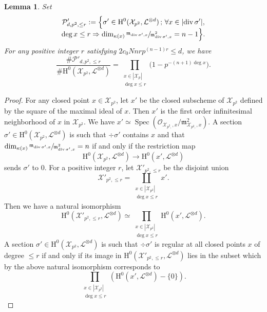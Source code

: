 \documentclass[11pt]{article}
\numberwithin{equation}{section}
\newcommand{\sep}{\,;\,}
\theoremstyle{plain}
\newtheorem{lem}[thm]{Lemma}
\theoremstyle{definition}
\newcommand{\ho}{\mathrm{H}}
\newcommand{\Oc}{\mathcal{O}}
\newcommand{\m}{\mathfrak{m}}
\newcommand{\X}{\mathcal{X}}
\newcommand{\li}{\mathcal{L}}
\DeclareMathOperator{\Spec}{Spec}
\begin{document}
\begin{lem}\label{smalldegree}
Set
\begin{multline*}
\mathcal{P}'_{d,p^2,\leq r}:=\Bigl\{ \sigma'\in \ho^0(\X_{p^2}, \li^{\otimes d})\sep \forall x\in |{\div\sigma'}|,\\[-5pt] \deg x\leq r\Rightarrow \dim_{\kappa(x)}\sfrac{\m_{\div \sigma',x}}{\m^2_{\div \sigma', x}}=n-1 \Bigr\}.
\end{multline*}
For any positive integer $r$ satisfying $2c_0Nnrp^{(n-1)r}\leq d$, we have
\[
\frac{\#\mathcal{P}'_{d,p^2,\leq r}}{\#\ho^0(\X_{p^2}, \li^{\otimes d})}=\prod_{\substack{x\in |\X_{p}|\\ \deg x\leq r}} \bigl(1-p^{-(n+1)\deg x} \bigr).
\]
\end{lem}
\begin{proof}
For any closed point $x\in \X_{p^2}$, let $x'$ be the closed subscheme of $\X_{p^2}$ defined by the square of the maximal ideal of $x$. Then $x'$ is the first order infinitesimal neighborhood of $x$ in $\X_{p^2}$. We have $x'\simeq \Spec (\Oc_{\X_{p^2,},x}/\mathfrak{m}_{\X_{p^2,},x}^2)$. A section $\sigma'\in \ho^0(\X_{p^2}, \li^{\otimes d})$ is such that $\div \sigma'$ contains $x$ and that $ \dim_{\kappa(x)}\sfrac{\m_{\div \sigma',x}}{\m^2_{\div \sigma', x}}=n$ if and only if the restriction map\vspace*{-3pt}
\[
\ho^0(\X_{p^2}, \li^{\otimes d}) \to \ho^0(x', \li^{\otimes d})
\]
sends $\sigma'$ to $0$. For a positive integer $r$, let $\X'_{p^2,\leq r}$ be the disjoint union\vspace*{-3pt}
\[
\X'_{p^2,\leq r}=\coprod_{\substack{x\in |\X_{p^2}|\\ \deg x\leq r}}x'.\]
Then we have a natural isomorphism\vspace*{-3pt}
\[
\ho^0(\X'_{p^2,\leq r}, \li^{\otimes d})\simeq \prod_{\substack{x\in |\X_{p^2}|\\ \deg x\leq r}}\ho^0(x', \li^{\otimes d}).
\]
A section $\sigma'\in \ho^0(\X_{p^2}, \li^{\otimes d})$ is such that $\div \sigma'$ is regular at all closed points $x$ of degree $\leq r$ if and only if its image in $\ho^0(\X'_{p^2,\leq r}, \li^{\otimes d})$ lies in the subset which by the above natural isomorphism corresponds to\vspace*{-3pt}
\[
\prod_{\substack{x\in |\X_{p^2}|\\ \deg x\leq r}}\left(\ho^0(x', \li^{\otimes d})-\{0\}\right).
\]


\end{proof}
\end{document}
